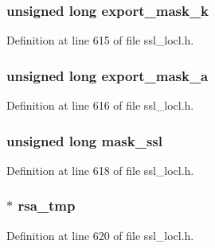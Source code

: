 \subsubsection[{\texorpdfstring{export\+\_\+mask\+\_\+k}{export_mask_k}}]{\setlength{\rightskip}{0pt plus 5cm}unsigned long export\+\_\+mask\+\_\+k}\hypertarget{structcert__st_aaf4a59c7fc3c59eb07c20e752d7db1da}{}\label{structcert__st_aaf4a59c7fc3c59eb07c20e752d7db1da}


Definition at line 615 of file ssl\+\_\+locl.\+h.

\subsubsection[{\texorpdfstring{export\+\_\+mask\+\_\+a}{export_mask_a}}]{\setlength{\rightskip}{0pt plus 5cm}unsigned long export\+\_\+mask\+\_\+a}\hypertarget{structcert__st_ab5a08f89823ef1cacbb84792d44d5a36}{}\label{structcert__st_ab5a08f89823ef1cacbb84792d44d5a36}


Definition at line 616 of file ssl\+\_\+locl.\+h.

\subsubsection[{\texorpdfstring{mask\+\_\+ssl}{mask_ssl}}]{\setlength{\rightskip}{0pt plus 5cm}unsigned long mask\+\_\+ssl}\hypertarget{structcert__st_af79c19cff62732da694ee0fb3d8b5a53}{}\label{structcert__st_af79c19cff62732da694ee0fb3d8b5a53}


Definition at line 618 of file ssl\+\_\+locl.\+h.

\subsubsection[{\texorpdfstring{rsa\+\_\+tmp}{rsa_tmp}}]{$\ast$ rsa\+\_\+tmp}\hypertarget{structcert__st_a64e6e76e48d7b645c50717aee25fb6cd}{}\label{structcert__st_a64e6e76e48d7b645c50717aee25fb6cd}


Definition at line 620 of file ssl\+\_\+locl.\+h.

